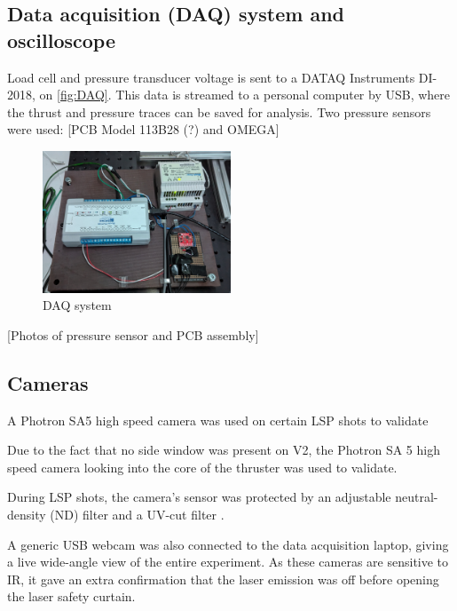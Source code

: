         \subsection{Data acquisition (DAQ) system and oscilloscope}

            Load cell and pressure transducer voltage is sent to a DATAQ Instruments DI-2018, on \autoref{fig:DAQ}. This data is streamed to a personal computer by USB, where the thrust and pressure traces can be saved for analysis. Two pressure sensors were used: [PCB Model 113B28 (?) and OMEGA]

            \begin{figure}[!ht]
                \centering
                \includegraphics[width=0.50\textwidth]{assets/3 design/DAQ electronics.jpg}
                \caption{DAQ system}
                \label{fig:DAQ}
            \end{figure}

            [Photos of pressure sensor and PCB assembly]

        \subsection{Cameras}

            A Photron SA5 high speed camera was used on certain LSP shots to validate 
            
            Due to the fact that no side window was present on V2, the Photron SA 5 high speed camera looking into the core of the thruster was used to validate.


            During LSP shots, the camera's sensor was protected by an adjustable neutral-density (ND) filter and a UV-cut filter .

            A generic USB webcam was also connected to the data acquisition laptop, giving a live wide-angle view of the entire experiment. As these cameras are sensitive to IR, it gave an extra confirmation that the laser emission was off before opening the laser safety curtain.

